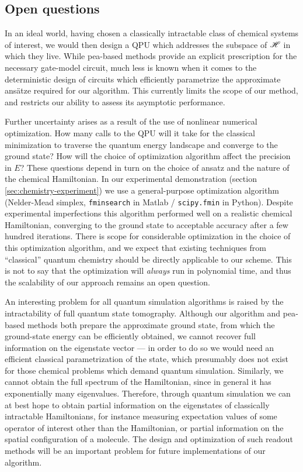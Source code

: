 \subsection{Open questions}
In an ideal world, having chosen a classically intractable class of chemical systems of interest, we would then design a QPU which addresses the subspace of $\mathscr{H}$ in which they live.  While \gls{pea}-based methods provide an explicit prescription for the necessary gate-model circuit, much less is known when it comes to the deterministic design of circuits which efficiently parametrize the approximate ans\"atze required for our algorithm. This currently limits the scope of our method, and restricts our ability to assess its asymptotic performance. 

Further uncertainty arises as a result of the use of nonlinear numerical optimization.  
How many calls to the QPU will it take for the classical minimization to traverse the quantum energy landscape and converge to the ground state? How will the choice of optimization algorithm affect the precision in $E$? These questions depend in turn on the choice of ansatz and the nature of the chemical Hamiltonian.  
In our experimental demonstration (section \ref{sec:chemistry-experiment}) we use a general-purpose optimization algorithm (Nelder-Mead simplex, \texttt{fminsearch} in Matlab / \texttt{scipy.fmin} in Python). Despite experimental imperfections this algorithm performed well on a realistic chemical Hamiltonian, converging to the ground state to acceptable accuracy after a few hundred iterations. There is scope for considerable optimization in the choice of this optimization algorithm, and we expect that existing techniques from ``classical'' quantum chemistry should be directly applicable to our scheme.  This is not to say that the optimization will \emph{always} run in polynomial time, and thus the scalability of our approach remains an open question.

An interesting problem for all quantum simulation algorithms is raised by the intractability of full quantum state tomography. Although our algorithm and \gls{pea}-based methods both prepare the approximate ground state, from which the ground-state energy can be efficiently obtained, we cannot recover full information on the eigenstate vector --- in order to do so we would need an efficient classical parametrization of the state, which presumably does not exist for those chemical problems which demand quantum simulation. Similarly, we cannot obtain the full spectrum of the Hamiltonian, since in general it has exponentially many eigenvalues. Therefore, through quantum simulation we can at best hope to obtain partial information on the eigenstates of classically intractable Hamiltonians, for instance measuring expectation values of some operator of interest other than the Hamiltonian, or partial information on the spatial configuration of a molecule. The design and optimization of such readout methods will be an important problem for future implementations of our algorithm.

